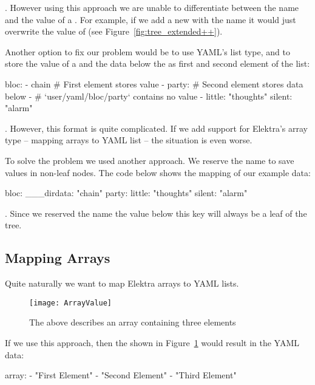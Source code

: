 . However using this approach we are unable to differentiate between the name and the value of a . For example, if we add a new  with the name  it would just overwrite the value of  (see Figure~\ref{fig:tree_extended++}).

Another option to fix our problem would be to use YAML’s list type, and to store the value of a  and the data below the  as first and second element of the list:

\begin{yamlcode}
  bloc:
    - chain                 # First element stores value
    - party:                # Second element stores data below
      -                     # `user/yaml/bloc/party` contains no value
      - little: "thoughts"
        silent: "alarm"
\end{yamlcode}

. However, this format is quite complicated. If we add support for Elektra’s array type – mapping arrays to YAML list – the situation is even worse.

To solve the problem we used another approach. We reserve the name  to save values in non-leaf nodes. The code below shows the mapping of our example data:

\begin{yamlcode}
  bloc:
    ___dirdata: "chain"
    party:
      little: "thoughts"
      silent: "alarm"
\end{yamlcode}

. Since we reserved the name  the value below this key will always be a leaf of the tree.

\subsection{Mapping Arrays}

Quite naturally we want to map Elektra arrays to YAML lists.

\begin{figure}
  \centering
    \texttt{[image: ArrayValue]}
  \caption{The  above describes an array containing three elements}
  \label{fig:array_value}
\end{figure}

If we use this approach, then the  shown in Figure~\ref{fig:array_value} would result in the YAML data:

\begin{yamlcode}
  array:
    - "First Element"
    - "Second Element"
    - "Third Element"
\end{yamlcode}

